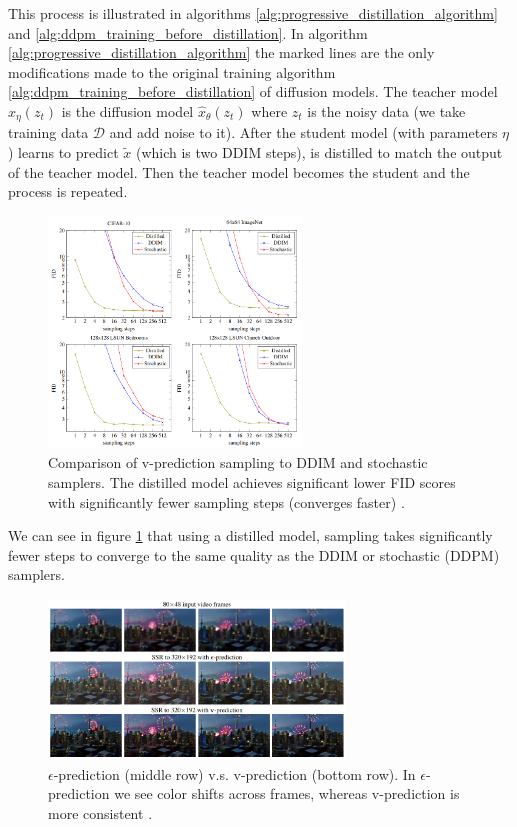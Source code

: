 This process is illustrated in algorithms \ref{alg:progressive_distillation_algorithm} and \ref{alg:ddpm_training_before_distillation}. In algorithm \ref{alg:progressive_distillation_algorithm} the marked lines are the only modifications made to the original training algorithm \ref{alg:ddpm_training_before_distillation} of diffusion models. The teacher model $\hat{x}_{\eta} (z_t)$ is the diffusion model $\hat{x}_{\theta} (z_t)$ where $z_t$ is the noisy data (we take training data $\mathcal{D}$ and add noise to it). After the student model (with parameters $\eta$) learns to predict $\tilde{x}$ (which is two DDIM steps), is distilled to match the output of the teacher model. Then the teacher model becomes the student and the process is repeated.

\begin{figure}
    \centering
    \includegraphics[width=0.6\textwidth]{images/imagen_video/samplers_comparison.png}
    \caption{Comparison of v-prediction sampling to DDIM and stochastic samplers. The distilled model achieves significant lower FID scores with significantly fewer sampling steps (converges faster) \cite{v_prediction}.}
    \label{fig:samplers_comparison}
\end{figure}

We can see in figure \ref{fig:samplers_comparison} that using a distilled model, sampling takes significantly fewer steps to converge to the same quality as the DDIM or stochastic (DDPM) samplers.

\begin{figure}
    \centering
    \includegraphics[width=0.7\textwidth]{images/imagen_video/e_prediction_vs_v_prediction.png}
    \caption{$\epsilon$-prediction (middle row) v.s. v-prediction (bottom row). In $\epsilon$-prediction we see color shifts across frames, whereas v-prediction is more consistent \cite{imagen_video}.}
    \label{fig:imagen_video_epsilon_prediction_vs_v_prediction}
\end{figure}

